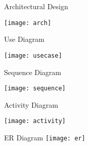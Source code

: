 \documentclass{beamer}
\begin{document}
\begin{frame}{Architectural Design}
\begin{center}
	\texttt{[image: arch]}
\end{center}
\end{frame}

\begin{frame}{Use Diagram}
\begin{center}
	\texttt{[image: usecase]}
\end{center}

\end{frame}

\begin{frame}{Sequence Diagram}
\begin{center}
	\texttt{[image: sequence]}
\end{center}
\end{frame}

\begin{frame}{Activity Diagram}
\begin{center}
	\texttt{[image: activity]}
	\end{center}
\end{frame}


\begin{frame}{ER Diagram}
	\texttt{[image: er]}
\end{frame}
\end{document}
